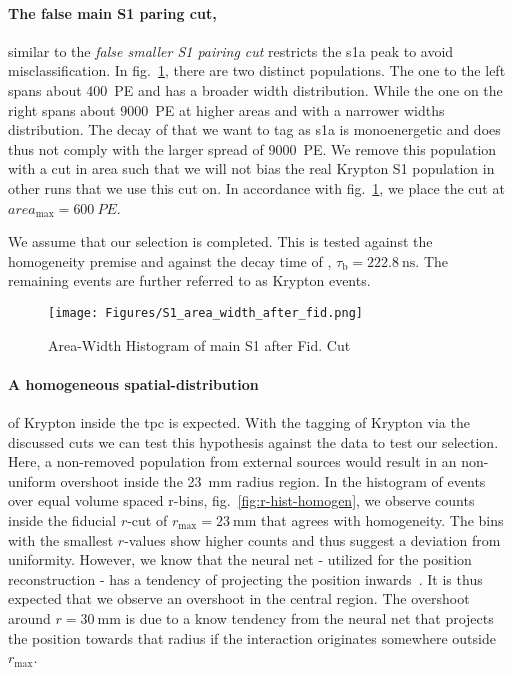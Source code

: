 \paragraph{The false main S1 paring cut,} similar to the \emph{false smaller S1 pairing cut} restricts the \gls{s1a} peak to avoid misclassification.
In fig.~\ref{fig:main_s1_area_width}, there are two distinct populations.
The one to the left spans about \SI{400}{PE} and has a broader width distribution.
While the one on the right spans about \SI{9000}{PE} at higher areas and with a narrower widths distribution.
The decay of  that we want to tag as \gls{s1a} is monoenergetic and does thus not comply with the larger spread of \SI{9000}{PE}.
We remove this population with a cut in area such that we will not bias the real Krypton S1 population in other runs that we use this cut on.
In accordance with fig.~\ref{fig:main_s1_area_width}, we place the cut at $ area_\mathrm{max} = \SI{600}{PE}$.

We assume that our selection is completed.
This is tested against the homogeneity premise and against the decay time of , $\tau_\mathrm{b} = \SI{222.8}{\nano\s}$.
The remaining events are further referred to as Krypton events.


\begin{figure}
\centering
\texttt{[image: Figures/S1\_area\_width\_after\_fid.png]}  %
\caption[Area-Width Histogram of main S1 after Fid. Cut]{
        Area-Width Histogram of main S1 after Fid. Cut
    }
\label{fig:main_s1_area_width}
\end{figure}


\paragraph{A homogeneous spatial-distribution} of Krypton inside the \gls{tpc} is expected.
With the tagging of Krypton via the discussed cuts we can test this hypothesis against the data to test our selection.
Here, a non-removed population from external sources would result in an non-uniform overshoot inside the \SI{23}{\milli\meter} radius region.
In the histogram of events over equal volume spaced r-bins, fig.~\ref{fig:r-hist-homogen}, we observe counts inside the fiducial $ r $-cut of $r_\mathrm{max} = \SI{23}{\milli\m}$ that agrees with homogeneity.
The bins with the smallest $ r $-values show higher counts and thus suggest a deviation from uniformity.
However, we know that the neural net - utilized for the position reconstruction - has a tendency of projecting the position inwards~\cite{ABism}.
It is thus expected that we observe an overshoot in the central region.
The overshoot around $ r = \SI{30}{\milli\m} $ is due to a know tendency from the neural net that projects the position towards that radius if the interaction originates somewhere outside $ r_\mathrm{max} $.

